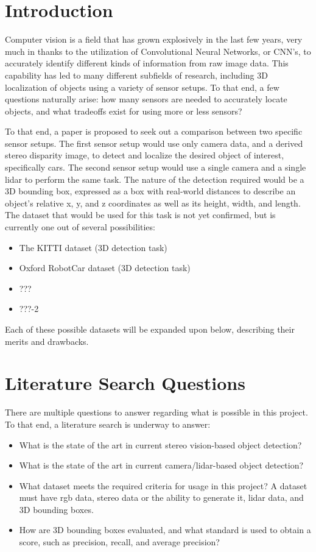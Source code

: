 \section{Introduction}
Computer vision is a field that has grown explosively in the last few years, very much in thanks to the utilization of Convolutional Neural Networks, or CNN's, to accurately identify different kinds of information from raw image data. This capability has led to many different subfields of research, including 3D localization of objects using a variety of sensor setups. To that end, a few questions naturally arise: how many sensors are needed to accurately locate objects, and what tradeoffs exist for using more or less sensors?  

To that end, a paper is proposed to seek out a comparison between two specific sensor setups. The first sensor setup would use only camera data, and a derived stereo disparity image, to detect and localize the desired object of interest, specifically cars. The second sensor setup would use a single camera and a single lidar to perform the same task. The nature of the detection required would be a 3D bounding box, expressed as a box with real-world distances to describe an object's relative x, y, and z coordinates as well as its height, width, and length. The dataset that would be used for this task is not yet confirmed, but is currently one out of several possibilities: 

\begin{itemize} \itemsep=-0.5em
\item The KITTI dataset (3D detection task)
\item Oxford RobotCar dataset (3D detection task)
\item ???
\item ???-2
\end{itemize}
Each of these possible datasets will be expanded upon below, describing their merits and drawbacks. 


\section{Literature Search Questions}
There are multiple questions to answer regarding what is possible in this project. To that end, a literature search is underway to answer: 

\begin{itemize} \itemsep=-0.5em
\item What is the state of the art in current stereo vision-based object detection? 
\item What is the state of the art in current camera/lidar-based object detection?
\item What dataset meets the required criteria for usage in this project? A dataset must have rgb data, stereo data or the ability to generate it, lidar data, and 3D bounding boxes.
\item How are 3D bounding boxes evaluated, and what standard is used to obtain a score, such as precision, recall, and average precision?
\end{itemize}

